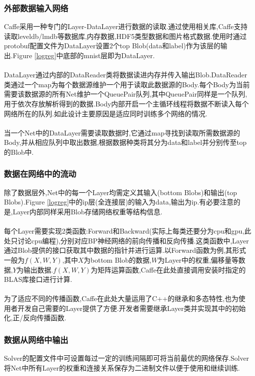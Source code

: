\documentclass[a4paper]{article}
\begin{document}
	\subsubsection{外部数据输入网络}
	Caffe采用一种专门的Layer-DataLayer进行数据的读取.通过使用相关库,Caffe支持读取leveldb/lmdb等数据库,内存数据,HDF5类型数据和图片格式数据.使用时通过protobuf配置文件为DataLayer设置2个top Blob(data和label)作为该层的输出.Figure \ref{logreg}中底部的mnist层即为DataLayer.\\\\
	DataLayer通过内部的DataReader类将数据读进内存并传入输出Blob.DataReader类通过一个map为每个数据源维护一个用于读取此数据源的Body.每个Body为当前需要该数据源的所有Net维护一个QueuePair队列,其中QueuePair同样是一个队列,用于依次存放解析得到的数据.Body内部开启一个主循环线程将数据不断读入每个网络所在的队列.如此设计主要原因是适应同时训练多个网络的情况.\\\\
	当一个Net中的DataLayer需要读取数据时,它通过map寻找到读取所需数据源的Body,并从相应队列中取出数据,根据数据种类将其分为data和label并分别传至top的Blob中.
	\subsubsection{数据在网络中的流动}
	除了数据层外,Net中的每一个Layer均需定义其输入(bottom Blobs)和输出(top Blobs).Figure \ref{logreg}中的ip层(全连接层)的输入为data,输出为ip.有必要注意的是,Layer内部同样采用Blob存储网络权重等结构信息.\\\\
	每个Layer需要实现2类函数:Forward和Backward(实际上每类还要分为cpu和gpu,此处只讨论cpu编程),分别对应BP神经网络的前向传播和反向传播.这类函数中,Layer通过Blob提供的接口获取其中数据的指针并进行运算.以Forward函数为例,其形式一般为$f\left(X,W,Y\right)$,其中$X$为bottom Blob的数据,$W$为Layer中的权重,偏移量等数据,$Y$为输出数据.$f\left(X,W,Y\right)$为矩阵运算函数,Caffe在此处直接调用安装时指定的BLAS库接口进行计算.\\\\
	为了适应不同的传播函数,Caffe在此处大量运用了C++的继承和多态特性,也为使用者开发自己需要的Layer提供了方便.开发者需要继承Layer类并实现其中的初始化,正/反向传播函数.
	\subsubsection{数据从网络中输出}
	Solver的配置文件中可设置每过一定的训练间隔即可将当前最优的网络保存.Solver将Net中所有Layer的权重和连接关系保存为二进制文件以便于使用和继续训练.
	
\end{document}
